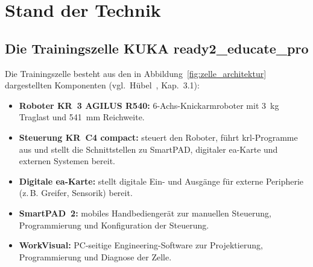 \section{Stand der Technik}
\label{sec:sdt}

\subsection{Die Trainingszelle KUKA ready2\_educate\_pro}
\label{sec:zelle}

Die Trainingszelle besteht aus den in Abbildung~\ref{fig:zelle_architektur}
dargestellten Komponenten (vgl.\ Hübel~\cite{huebel2022}, Kap.~3.1):

\begin{itemize}
    \item \textbf{Roboter KR~3 AGILUS R540:} 6-Achs-Knickarmroboter mit
    \SI{3}{\kilogram} Traglast und \SI{541}{\milli\meter} Reichweite.
    \item \textbf{Steuerung KR~C4 compact:} steuert den Roboter, führt
    \ac{krl}-Programme aus und stellt die Schnittstellen zu SmartPAD,
    digitaler \ac{ea}-Karte und externen Systemen bereit.
    \item \textbf{Digitale \ac{ea}-Karte:} stellt digitale Ein- und Ausgänge
    für externe Peripherie (z.\,B. Greifer, Sensorik) bereit.
    \item \textbf{SmartPAD~2:} mobiles Handbediengerät zur manuellen
    Steuerung, Programmierung und Konfiguration der Steuerung.
    \item \textbf{WorkVisual:} PC-seitige Engineering-Software zur
    Projektierung, Programmierung und Diagnose der Zelle.
\end{itemize}

